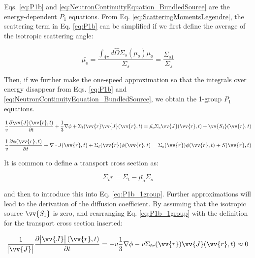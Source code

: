 \documentclass[10pt]{article}
\begin{document}
\begin{flushleft}
Eqs. \ref{eq:P1b} and \ref{eq:NeutronContinuityEquation_BundledSource} are the energy-dependent \(P_1\) equations. From Eq. \ref{eq:ScatteringMomentsLegendre}, the scattering term in Eq. \ref{eq:P1b} can be simplified if we first define the average of the isotropic scattering angle:

\begin{equation}
\label{eq:IsotropicScatteringAngle}
\bar{\mu_o} = \frac{\int_{4\pi}^{} d\hat{\Omega}\Sigma_s(\mu_o)\mu_o}{\Sigma_s} = \frac{\Sigma_{s1}}{\Sigma_s}
\end{equation}

Then, if we further make the one-speed approximation so that the integrals over energy disappear from Eqs. \ref{eq:P1b} and \ref{eq:NeutronContinuityEquation_BundledSource}, we obtain the 1-group \(P_1\) equations. 

\begin{equation}
\label{eq:P1b_1group}
\frac{1}{v} \frac{\partial\vv{J}(\vv{r}, t)}{\partial t} +
 \frac{1}{3}\nabla\phi + \Sigma_t(\vv{r}\vv{J}(\vv{r},t) = \bar{\mu_o}\Sigma_s\vv{J}(\vv{r}, t) + \vv{S_1}(\vv{r}, t)
\end{equation}

\begin{equation}
\label{eq:NeutronContinuityEquation_BundledSource_1group}
\frac{1}{v} \frac{\partial\phi(\vv{r}, t)}{\partial t} +
 \nabla\cdot J(\vv{r}, t) + 
 \Sigma_t(\vv{r})\phi(\vv{r}, t) = \Sigma_s(\vv{r})\phi(\vv{r}, t) + S(\vv{r}, t)
\end{equation}

It is common to define a transport cross section as:

\begin{equation}
\label{eq:TransportCrossSection}
\Sigma_tr=\Sigma_t-\bar{\mu_o}\Sigma_s
\end{equation}

and then to introduce this into Eq. \ref{eq:P1b_1group}. Further approximations will lead to the derivation of the diffusion coefficient. By assuming that the isotropic source \(\vv{S_1}\) is zero, and rearranging Eq. \ref{eq:P1b_1group} with the definition for the transport cross section inserted:

\begin{equation}
\label{eq:P1b_CurrentApproximation}
\frac{1}{\abs{{\vv{J}}}} \frac{\partial\abs{{\vv{J}}}(\vv{r}, t)}{\partial t} = - v\frac{1}{3}\nabla\phi - v\Sigma_{tr}(\vv{r})\vv{J}(\vv{r},t) \approx 0
\end{equation}


\end{flushleft}
\end{document}

